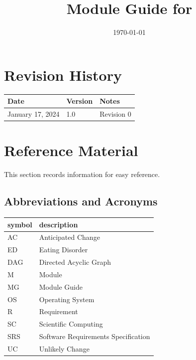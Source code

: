 \documentclass[12pt, titlepage]{article}
\begin{document}
\title{Module Guide for \progname{}} 
\author{\authname}
\date{\today}

\maketitle


\section{Revision History}

\begin{tabularx}{\textwidth}{p{3cm}p{2cm}X}
\toprule {\bf Date} & {\bf Version} & {\bf Notes}\\
\midrule
January 17, 2024 & 1.0 & Revision 0\\
\bottomrule
\end{tabularx}

\newpage

\section{Reference Material}

This section records information for easy reference.

\subsection{Abbreviations and Acronyms}

\renewcommand{\arraystretch}{1.2}
\begin{tabular}{l l} 
  \toprule		
  \textbf{symbol} & \textbf{description}\\
  \midrule 
  AC & Anticipated Change\\
  ED & Eating Disorder\\
  DAG & Directed Acyclic Graph \\
  M & Module \\
  MG & Module Guide \\
  OS & Operating System \\
  R & Requirement\\
  SC & Scientific Computing \\
  SRS & Software Requirements Specification\\
  UC & Unlikely Change \\
  \bottomrule
\end{tabular}\\
\end{document}
